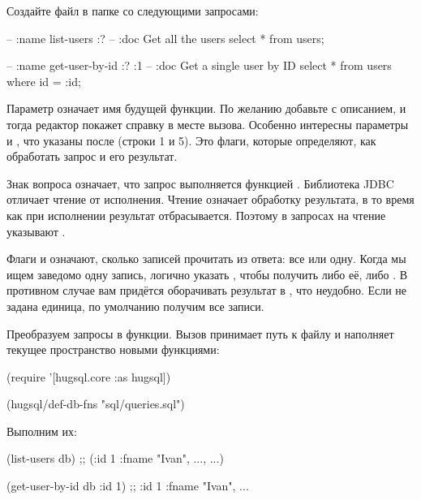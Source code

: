 Создайте файл  в папке  со следующими запросами:

\begin{english}
  \begin{sql/lines}
-- :name list-users :?
-- :doc Get all the users
select * from users;

-- :name get-user-by-id :? :1
-- :doc Get a single user by ID
select * from users
where id = :id;
  \end{sql/lines}
\end{english}

Параметр  означает имя будущей функции. По желанию добавьте  с описанием, и тогда редактор покажет справку в месте вызова. Особенно интересны параметры  и , что указаны после  (строки 1 и 5). Это флаги, которые определяют, как обработать запрос и его результат.

Знак вопроса означает, что запрос выполняется функцией . Библиотека JDBC отличает чтение от исполнения. Чтение означает обработку результата, в то время как при исполнении результат отбрасывается. Поэтому в запросах на чтение указывают .

Флаги \code{:*} и  означают, сколько записей прочитать из ответа: все или одну. Когда мы ищем заведомо одну запись, логично указать , чтобы получить либо её, либо . В противном случае вам придётся оборачивать результат в , что неудобно. Если не задана единица, по умолчанию получим все записи.

Преобразуем запросы в функции. Вызов  принимает путь к файлу и наполняет текущее пространство новыми функциями:

\begin{english}
  \begin{clojure}
(require '[hugsql.core :as hugsql])

(hugsql/def-db-fns "sql/queries.sql")
  \end{clojure}
\end{english}

Выполним их:

\begin{english}
  \begin{clojure}
(list-users db)
;; ({:id 1 :fname "Ivan", ...}, ...)

(get-user-by-id db {:id 1})
;; {:id 1 :fname "Ivan", ...}
  \end{clojure}
\end{english}

